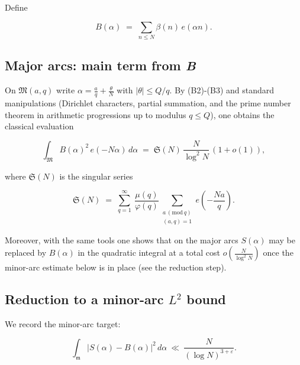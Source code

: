 \documentclass[11pt]{article}
\theoremstyle{definition}
\theoremstyle{remark}
\numberwithin{equation}{part}
\begin{document}
Define

$$
	B(\alpha)\;=\;\sum_{n\le N}\beta(n)\,e(\alpha n).
$$


\subsection*{Major arcs: main term from \textit{B}}

On $\mathfrak M(a,q)$ write $\alpha=\tfrac{a}{q}+\tfrac{\theta}{N}$ with
$|\theta|\le Q/q$. By (B2)-(B3) and standard manipulations (Dirichlet characters, partial summation, and the prime number theorem in arithmetic progressions up to modulus $q\le Q$), one obtains the classical evaluation

$$
	\int_{\mathfrak M} B(\alpha)^2\,e(-N\alpha)\,d\alpha
	\;=\;\mathfrak S(N)\,\frac{N}{\log^2 N}\,(1+o(1)),
$$

where $\mathfrak S(N)$ is the singular series

$$
	\mathfrak S(N)\;=\;\sum_{q=1}^{\infty}\ \frac{\mu(q)}{\varphi(q)}\!
	\sum_{\substack{a\,(\mathrm{mod}\,q)\\(a,q)=1}} e\!\left(-\frac{Na}{q}\right).
$$

Moreover, with the same tools one shows that on the major arcs $S(\alpha)$ may be replaced by $B(\alpha)$ in the quadratic integral at a total cost $o\!\left(\tfrac{N}{\log^2 N}\right)$ once the minor-arc estimate below is in place (see the reduction step).


\subsection*{Reduction to a minor-arc \texorpdfstring{$L^2$}{L-2} bound}

We record the minor-arc target:

\begin{equation}\label{eq:A1}
	\int_{\mathfrak m}|S(\alpha)-B(\alpha)|^2\,d\alpha\ \ll\ \frac{N}{(\log N)^{3+\varepsilon}}.
\end{equation}
\end{document}
